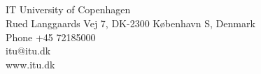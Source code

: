 \documentclass[a4paper,11pt,twoside,onecolumn,openright]{memoir}
\begin{document}
\newpage
\hfill\\
\hfill\\
\hfill\\
\hfill\\
\hfill\\
\hfill\\
\hfill\\
\hfill\\
\hfill\\
\hfill\\
\hfill\\
\hfill\\
\hfill\\
\hfill\\
\hfill\\
\hfill\\
\hfill\\
\hfill\\
\hfill\\
\hfill\\
\hfill\\
\hfill\\
\hfill\\
\hfill\\
\hfill\\
\hfill\\
\hfill\\
\hfill\\
\hfill\\
\hfill\\
\hfill\\
\hfill\\
\hfill\\
\hfill\\
\hfill\\
\hfill\\
\linebreak
IT University of Copenhagen\\
Rued Langgaards Vej 7, DK-2300 K\o benhavn S, Denmark\\
Phone +45 72185000\\
itu@itu.dk\\
www.itu.dk\\
\clearpage

\hfill\\
\hfill\\
\hfill\\
\hfill\\
\hfill\\
\hfill\\
\hfill\\
\hfill\\
\hfill\\
\hfill\\
\end{document}

